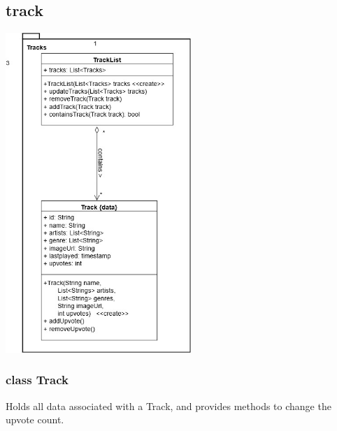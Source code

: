 \documentclass[oneside, nenglish]{sdqtechreport}
\begin{document}
\subsection{track}
\begin{center}
\includegraphics[width = 7cm]{LATEX/Entwurf/Graphics/Track.jpg}
\end{center}

\subsubsection{class Track}
Holds all data associated with a Track, and provides methods to change the upvote count.
\end{document}
